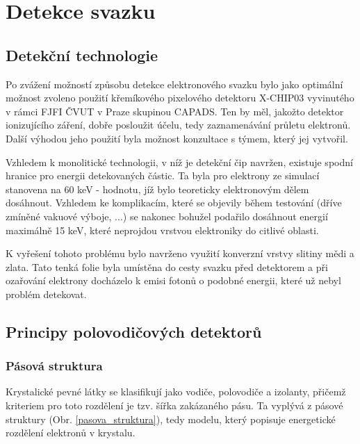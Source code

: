 \newcommand{\fig}[3]{ 
	\begin{figure}[!ht]
		\centering
		\texttt{[image: Figure/07/\#2.png]}
		\caption{#3}
		\label{#2}
	\end{figure}
}

\renewcommand{\figurename}{Obr.}
\newcommand{\figref}[1]{\figurename \hspace{1 pt} \ref{#1}}

\newpage \clearpage

\chapter{Detekce svazku}

\section{Detekční technologie}
Po zvážení možností způsobu detekce elektronového svazku bylo jako optimální možnost zvoleno použití křemíkového pixelového detektoru X-CHIP03 vyvinutého v rámci FJFI ČVUT v Praze skupinou CAPADS. Ten by měl, jakožto detektor ionizujícího záření, dobře posloužit účelu, tedy zaznamenávání průletu elektronů. Další výhodou jeho použití byla možnost konzultace s týmem, který jej vytvořil. 

Vzhledem k monolitické technologii, v níž je detekční čip navržen, existuje spodní hranice pro energii detekovaných částic. Ta byla pro elektrony ze simulací stanovena na 60 keV - hodnotu, jíž bylo teoreticky elektronovým dělem dosáhnout. Vzhledem ke komplikacím, které se objevily během testování (dříve zmíněné vakuové výboje, ...) se nakonec bohužel podařilo dosáhnout energií maximálně 15 keV, které neprojdou vrstvou elektroniky do citlivé oblasti.

K vyřešení tohoto problému bylo navrženo využití konverzní vrstvy slitiny mědi a zlata. Tato tenká folie byla umístěna do cesty svazku před detektorem a při ozařování elektrony docházelo k emisi fotonů o podobné energii, které už nebyl problém detekovat. 

\section{Principy polovodičových detektorů}
\subsection{Pásová struktura}
Krystalické pevné látky se klasifikují jako vodiče, polovodiče a izolanty, přičemž kriteriem pro toto rozdělení je tzv. šířka zakázaného pásu. Ta vyplývá z pásové struktury (\figref{pasova_struktura}), tedy modelu, který popisuje energetické rozdělení elektronů v krystalu. 

